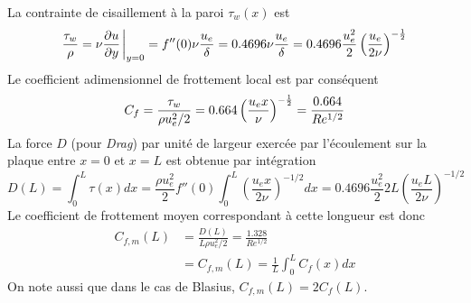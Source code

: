     La contrainte de cisaillement à la paroi $\tau_w(x)$ est
    \begin{equation}
      \frac{\tau_w}{\rho} = \nu \pdv{u}{y}\eval_{y=0} = f''(0) \nu \frac{u_e}{\delta} = 0.4696\nu\frac{u_e}{\delta} = 0.4696\frac{u_e^2}{2} \left(\frac{u_e}{2\nu}\right)^{-\recip{2}}
    \end{equation}
    Le coefficient adimensionnel de frottement local est par conséquent
    \begin{equation}
      C_f = \frac{\tau_w}{\rho u_e^2 /2} = 0.664 \left(\frac{u_e x}{\nu}\right)^{-\frac{1}{2}} = \frac{0.664}{Re^{1/2}}
    \end{equation}
    La force $D$ (pour \textit{Drag}) par unité de largeur exercée par l'écoulement sur la plaque entre $x=0$ et $x=L$ est obtenue par intégration
    \begin{equation}
      D(L) = \int_0^L \tau(x) dx = \frac{\rho u_e^2}{2} f''(0) \int_0^L \left(\frac{u_e x}{2\nu}\right)^{-1/2} dx = 0.4696 \frac{u_e^2}{2} 2 L \left(\frac{u_e L}{2\nu}\right)^{-1/2}
    \end{equation}
    Le coefficient de frottement moyen correspondant à cette longueur est donc
    \begin{equation}
      \begin{aligned}
        C_{f,m}(L) &= \frac{D(L)}{L \rho u_e^2/2} = \frac{1.328}{Re^{1/2}}\\
        &= C_{f,m}(L) = \frac{1}{L} \int_0^L C_f(x) dx
      \end{aligned}
    \end{equation}
    On note aussi que dans le cas de Blasius, $C_{f,m}(L) = 2C_f(L)$.

